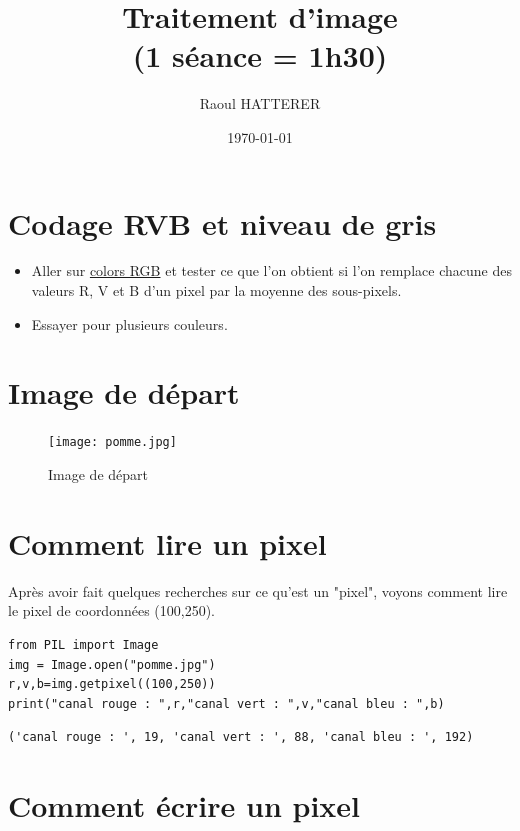 \documentclass[11pt]{article}
\author{Raoul HATTERER}
\date{\today}
\title{Traitement d'image\\\medskip
\large (1 séance = 1h30)}
\begin{document}
\maketitle
\setcounter{tocdepth}{1}
\tableofcontents




\section{Codage RVB et niveau de gris}
\label{sec:org1b0d0d9}

\begin{itemize}
\item Aller sur \href{https://www.w3schools.com/colors/colors\_rgb.asp}{colors RGB} et tester ce que l'on obtient si l'on remplace chacune des valeurs R, V et B d'un pixel par la moyenne des sous-pixels.
\item Essayer pour plusieurs couleurs.
\end{itemize}


\section{Image de départ}
\label{sec:orgb215a96}

\begin{figure}[htbp]
\centering
\texttt{[image: pomme.jpg]}
\caption{Image de départ}
\end{figure}


\section{Comment lire un pixel}
\label{sec:orgdf47ac8}

Après avoir fait quelques recherches sur ce qu'est un "pixel", voyons comment lire le pixel de coordonnées (100,250).

\begin{verbatim}
from PIL import Image
img = Image.open("pomme.jpg")
r,v,b=img.getpixel((100,250))
print("canal rouge : ",r,"canal vert : ",v,"canal bleu : ",b)
\end{verbatim}

\begin{verbatim}
('canal rouge : ', 19, 'canal vert : ', 88, 'canal bleu : ', 192)
\end{verbatim}


\section{Comment écrire un pixel}
\label{sec:org43712c9}
\end{document}
